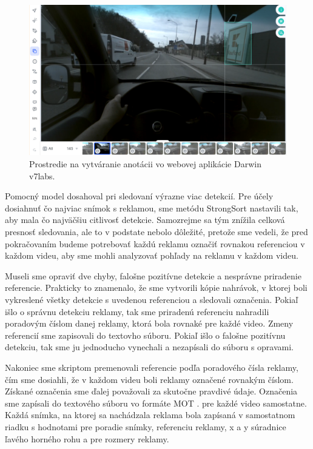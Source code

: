 \begin{figure}[ht]
     \centering
     \includegraphics[width=1\textwidth]{images/04/lab.png}
     \caption{Prostredie na vytváranie anotácii vo webovej aplikácie Darwin v7labs.}
     \label{img:lab}
 \end{figure}

Pomocný model dosahoval pri sledovaní výrazne viac detekcií. Pre účely dosiahnuť čo najviac snímok s reklamou, sme metódu StrongSort nastavili tak, aby mala čo najväčšiu citlivosť detekcie. Samozrejme sa tým znížila celková presnosť sledovania, ale to v podstate nebolo dôležité, pretože sme vedeli, že pred pokračovaním budeme potrebovať každú reklamu označiť rovnakou referenciou v každom videu, aby sme mohli analyzovať pohľady na reklamu v každom videu.

Museli sme opraviť dve chyby, falošne pozitívne detekcie a nesprávne priradenie referencie. Prakticky to znamenalo, že sme vytvorili kópie nahrávok, v ktorej boli vykreslené všetky detekcie s uvedenou referenciou a sledovali označenia. Pokiaľ išlo o správnu detekciu reklamy, tak sme priradenú referenciu nahradili poradovým číslom danej reklamy, ktorá bola rovnaké pre každé video. Zmeny referencií sme zapisovali do textovho súboru. Pokiaľ išlo o falošne pozitívnu detekciu, tak sme ju jednoducho vynechali a nezapísali do súboru s opravami.

Nakoniec sme skriptom premenovali referencie podľa poradového čísla reklamy, čím sme dosiahli, že v každom videu boli reklamy označené rovnakým číslom. Získané označenia sme ďalej považovali za skutočne pravdivé údaje. Označenia sme zapísali do textového súboru vo formáte MOT \cite{mot}. pre každé video samostatne. Každá snímka, na ktorej sa nachádzala reklama bola zapísaná v samostatnom riadku s hodnotami pre poradie snímky, referenciu reklamy, x a y súradnice ľavého horného rohu a pre rozmery reklamy.

